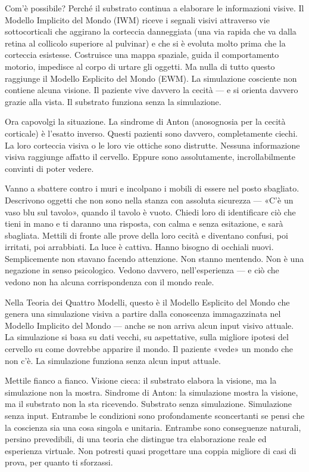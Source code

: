 \documentclass[11pt, twoside, openright]{book}
\begin{document}
Com'è possibile? Perché il substrato continua a elaborare le informazioni visive. Il Modello Implicito del Mondo (IWM) riceve i segnali visivi attraverso vie sottocorticali che aggirano la corteccia danneggiata (una via rapida che va dalla retina al collicolo superiore al pulvinar) e che si è evoluta molto prima che la corteccia esistesse. Costruisce una mappa spaziale, guida il comportamento motorio, impedisce al corpo di urtare gli oggetti. Ma nulla di tutto questo raggiunge il Modello Esplicito del Mondo (EWM). La simulazione cosciente non contiene alcuna visione. Il paziente vive davvero la cecità --- e si orienta davvero grazie alla vista. Il substrato funziona senza la simulazione.

Ora capovolgi la situazione. La sindrome di Anton (anosognosia per la cecità corticale) è l'esatto inverso. Questi pazienti sono davvero, completamente ciechi. La loro corteccia visiva o le loro vie ottiche sono distrutte. Nessuna informazione visiva raggiunge affatto il cervello. Eppure sono assolutamente, incrollabilmente convinti di poter vedere.

Vanno a sbattere contro i muri e incolpano i mobili di essere nel posto sbagliato. Descrivono oggetti che non sono nella stanza con assoluta sicurezza --- «C'è un vaso blu sul tavolo», quando il tavolo è vuoto. Chiedi loro di identificare ciò che tieni in mano e ti daranno una risposta, con calma e senza esitazione, e sarà sbagliata. Mettili di fronte alle prove della loro cecità e diventano confusi, poi irritati, poi arrabbiati. La luce è cattiva. Hanno bisogno di occhiali nuovi. Semplicemente non stavano facendo attenzione. Non stanno mentendo. Non è una negazione in senso psicologico. Vedono davvero, nell'esperienza --- e ciò che vedono non ha alcuna corrispondenza con il mondo reale.

Nella Teoria dei Quattro Modelli, questo è il Modello Esplicito del Mondo che genera una simulazione visiva a partire dalla conoscenza immagazzinata nel Modello Implicito del Mondo --- anche se non arriva alcun input visivo attuale. La simulazione si basa su dati vecchi, su aspettative, sulla migliore ipotesi del cervello su come dovrebbe apparire il mondo. Il paziente «vede» un mondo che non c'è. La simulazione funziona senza alcun input attuale.

Mettile fianco a fianco. Visione cieca: il substrato elabora la visione, ma la simulazione non la mostra. Sindrome di Anton: la simulazione mostra la visione, ma il substrato non la sta ricevendo. Substrato senza simulazione. Simulazione senza input. Entrambe le condizioni sono profondamente sconcertanti se pensi che la coscienza sia una cosa singola e unitaria. Entrambe sono conseguenze naturali, persino prevedibili, di una teoria che distingue tra elaborazione reale ed esperienza virtuale. Non potresti quasi progettare una coppia migliore di casi di prova, per quanto ti sforzassi.
\end{document}

